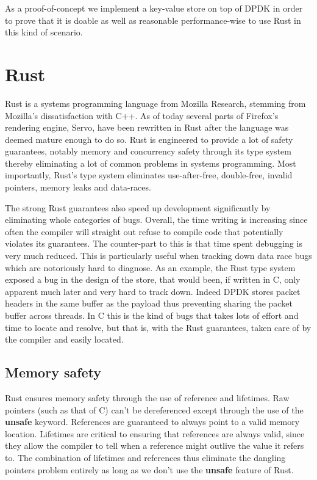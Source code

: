 \documentclass[11pt]{article}
\begin{document}
As a proof-of-concept we implement a key-value store on top of
DPDK in order to prove that it is doable as well as reasonable
performance-wise to use Rust in this kind of scenario.

\section{Rust}
Rust is a systems programming language from Mozilla Research, stemming
from Mozilla's dissatisfaction with C++. As of today several parts of
Firefox's rendering engine, Servo, have been rewritten
in Rust after the language was deemed mature enough to do so. Rust is
engineered to  provide a lot of safety guarantees, notably memory and
concurrency safety through its type system thereby eliminating a lot
of common problems in systems programming. Most importantly, Rust's
type system eliminates use-after-free, double-free, invalid pointers,
memory leaks and data-races.

The strong Rust guarantees also speed up development significantly by
eliminating whole categories of bugs. Overall, the time writing is
increasing since often the compiler will straight out refuse to
compile code that potentially violates its guarantees. The
counter-part to this is that time spent debugging is very much
reduced. This is particularly useful when tracking down data race bugs
which are notoriously hard to diagnose. As an example, the Rust type
system exposed a bug in the design of the store, that would been, if
written in C, only apparent much later and very hard to track
down. Indeed DPDK stores packet headers in the same buffer as the
payload thus preventing sharing the packet buffer across threads. In C
this is the kind of bugs that takes lots of effort and time to locate
and resolve, but that is, with the Rust guarantees, taken care of by
the compiler and easily located.

\subsection{Memory safety}

Rust ensures memory safety through the use of reference and
lifetimes. Raw pointers (such as that of C) can't be dereferenced
except through the use of the \textbf{unsafe} keyword. References are
guaranteed to always point to a valid memory location. Lifetimes are
critical to ensuring that references are always valid, since they
allow the compiler to tell when a reference might outlive the value it
refers to. The combination of lifetimes and references thus eliminate
the dangling pointers problem entirely as long as we don't use the
\textbf{unsafe} feature of Rust.
\end{document}
